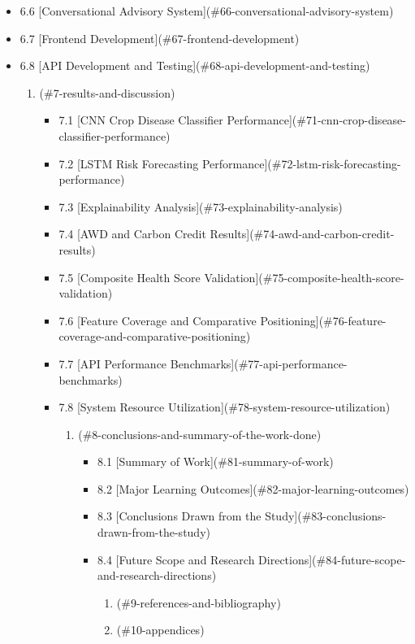 \documentclass[12pt, a4paper]{report}
\begin{document}
\begin{enumerate}[leftmargin=*]
\begin{itemize}[leftmargin=*]
\begin{enumerate}[leftmargin=*]
\begin{itemize}[leftmargin=*]
\begin{enumerate}[leftmargin=*]
\begin{itemize}[leftmargin=*]
\begin{enumerate}[leftmargin=*]
\begin{itemize}[leftmargin=*]
\begin{enumerate}[leftmargin=*]
\begin{itemize}[leftmargin=*]
  \item 6.6 [Conversational Advisory System](\#66-conversational-advisory-system)
  \item 6.7 [Frontend Development](\#67-frontend-development)
  \item 6.8 [API Development and Testing](\#68-api-development-and-testing)
\begin{enumerate}[leftmargin=*]
  \item [Results and Discussion](\#7-results-and-discussion)
\begin{itemize}[leftmargin=*]
  \item 7.1 [CNN Crop Disease Classifier Performance](\#71-cnn-crop-disease-classifier-performance)
  \item 7.2 [LSTM Risk Forecasting Performance](\#72-lstm-risk-forecasting-performance)
  \item 7.3 [Explainability Analysis](\#73-explainability-analysis)
  \item 7.4 [AWD and Carbon Credit Results](\#74-awd-and-carbon-credit-results)
  \item 7.5 [Composite Health Score Validation](\#75-composite-health-score-validation)
  \item 7.6 [Feature Coverage and Comparative Positioning](\#76-feature-coverage-and-comparative-positioning)
  \item 7.7 [API Performance Benchmarks](\#77-api-performance-benchmarks)
  \item 7.8 [System Resource Utilization](\#78-system-resource-utilization)
\begin{enumerate}[leftmargin=*]
  \item [Conclusions and Summary of the Work Done](\#8-conclusions-and-summary-of-the-work-done)
\begin{itemize}[leftmargin=*]
  \item 8.1 [Summary of Work](\#81-summary-of-work)
  \item 8.2 [Major Learning Outcomes](\#82-major-learning-outcomes)
  \item 8.3 [Conclusions Drawn from the Study](\#83-conclusions-drawn-from-the-study)
  \item 8.4 [Future Scope and Research Directions](\#84-future-scope-and-research-directions)
\begin{enumerate}[leftmargin=*]
  \item [References and Bibliography](\#9-references-and-bibliography)
  \item [Appendices](\#10-appendices)
\begin{itemize}[leftmargin=*]

\end{itemize}
\end{enumerate}
\end{itemize}
\end{enumerate}
\end{itemize}
\end{enumerate}
\end{itemize}
\end{enumerate}
\end{itemize}
\end{enumerate}
\end{itemize}
\end{enumerate}
\end{itemize}
\end{enumerate}
\end{itemize}
\end{enumerate}
\end{document}
